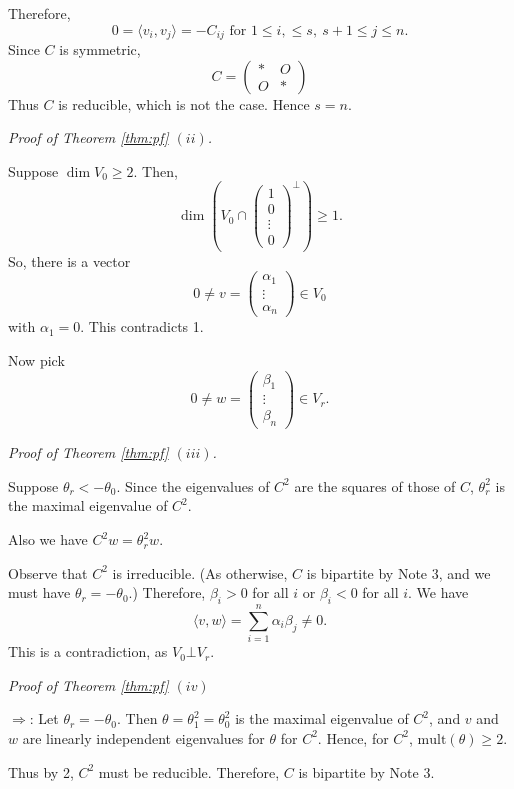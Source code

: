 \documentclass[
]{book}
\theoremstyle{definition}
\theoremstyle{definition}
\theoremstyle{definition}
\theoremstyle{definition}
\theoremstyle{remark}
\begin{document}
Therefore,
\[0 = \langle v_i, v_j \rangle = -C_{ij} \textrm{ for } 1\leq i, \leq s, \: s+1 \leq j \leq n.\]
Since \(C\) is symmetric,
\[C = \begin{pmatrix} \ast & O \\ O & \ast\end{pmatrix}\]
Thus \(C\) is reducible, which is not the case. Hence \(s = n\).

\emph{Proof of Theorem \ref{thm:pf} \((ii)\).}

Suppose \(\dim V_0 \geq 2\). Then,
\[\dim\left(V_0 \cap \begin{pmatrix}1\\0\\\vdots\\0\end{pmatrix}^\bot\right) \geq 1.\]
So, there is a vector
\[0\neq v = \begin{pmatrix}\alpha_1\\\vdots\\\alpha_n\end{pmatrix} \in V_0\]
with \(\alpha_1 = 0\). This contradicts 1.

Now pick
\[0\neq w = \begin{pmatrix}\beta_1\\\vdots\\\beta_n\end{pmatrix} \in V_r.\]

\emph{Proof of Theorem \ref{thm:pf} \((iii)\).}

Suppose \(\theta_r < -\theta_0\). Since the eigenvalues of \(C^2\) are the squares of those of \(C\), \(\theta_r^2\) is the maximal eigenvalue of \(C^2\).

Also we have \(C^2w = \theta_r^2w\).

Observe that \(C^2\) is irreducible. (As otherwise, \(C\) is bipartite by Note 3, and we must have \(\theta_r = -\theta_0\).)
Therefore, \(\beta_i > 0\) for all \(i\) or \(\beta_i < 0\) for all \(i\). We have
\[\langle v, w\rangle = \sum_{i=1}^n\alpha_i\beta_j \neq 0.\]
This is a contradiction, as \(V_0 \bot V_r\).

\emph{Proof of Theorem \ref{thm:pf} \((iv)\)}

\(\Rightarrow\): Let \(\theta_r = -\theta_0\). Then \(\theta = \theta_1^2 = \theta_0^2\) is the maximal eigenvalue of \(C^2\), and \(v\) and \(w\) are linearly independent eigenvalues for \(\theta\) for \(C^2\). Hence, for \(C^2\), \(\mathrm{mult}(\theta) \geq 2\).

Thus by 2, \(C^2\) must be reducible. Therefore, \(C\) is bipartite by Note 3.
\end{document}
